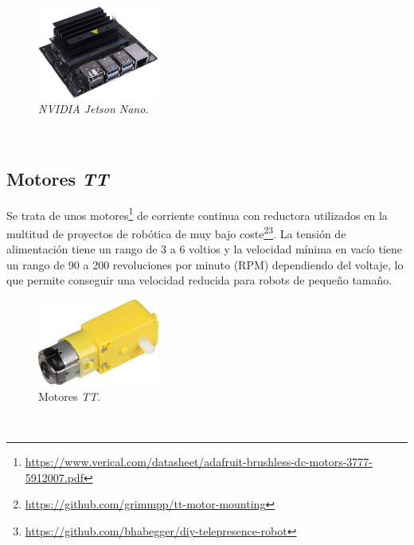 \begin{figure} [h!]
	\begin{center}
		\includegraphics[width=4cm]{figs/jetsonnano}
	\end{center}
	\caption{\textit{NVIDIA Jetson Nano}.}
	\label{fig:jetsonnano}
\end{figure}\

\subsection{Motores \textit{TT}}
Se trata de unos motores\footnote{\url{https://www.verical.com/datasheet/adafruit-brushless-dc-motors-3777-5912007.pdf}} de corriente continua con reductora utilizados en la multitud de proyectos de robótica de muy bajo coste\footnote{\url{https://github.com/grimmpp/tt-motor-mounting}}\footnote{\url{https://github.com/bhabegger/diy-telepresence-robot}}. La tensión de alimentación tiene un rango de 3 a 6 voltios y la velocidad mínima en vacío tiene un rango de 90 a 200 revoluciones por minuto (RPM) dependiendo del voltaje, lo que permite conseguir una velocidad reducida para robots de pequeño tamaño.\\

\begin{figure} [h!]
	\begin{center}
		\includegraphics[width=4cm]{figs/motorTT}
	\end{center}
	\caption{Motores \textit{TT}.}
	\label{fig:motorTT}
\end{figure}\

